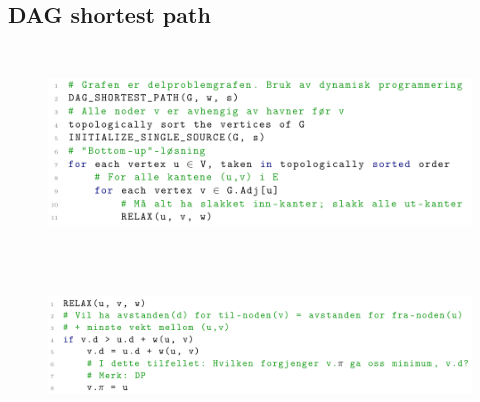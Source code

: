 \documentclass[12pt]{report}
\begin{document}
\subsection*{DAG shortest path}



\begin{figure}[H]
	\begin{Center}
		\includegraphics[width=6.3in,height=2.18in]{./media/image195.png}
	\end{Center}
\end{figure}



\par


\vspace{\baselineskip}



\begin{figure}[H]
	\begin{Center}
		\includegraphics[width=6.3in,height=1.45in]{./media/image196.png}
	\end{Center}
\end{figure}



\par
\end{document}
